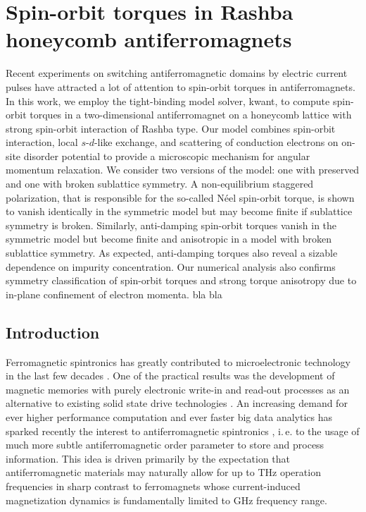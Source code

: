 \chapter{Spin-orbit torques in Rashba honeycomb antiferromagnets} %
Recent experiments on switching antiferromagnetic domains by electric current pulses have attracted a lot of attention to spin-orbit torques in antiferromagnets. In this work, we employ the tight-binding model solver, kwant,  to compute spin-orbit torques in a two-dimensional antiferromagnet on a honeycomb lattice with strong spin-orbit interaction of Rashba type. Our model combines spin-orbit interaction, local $s$-$d$-like exchange, and scattering of conduction electrons on on-site disorder potential to provide a microscopic mechanism for angular momentum relaxation. We consider two versions of the model: one with preserved and one with broken sublattice symmetry. A non-equilibrium staggered polarization, that is responsible for the so-called N\'eel spin-orbit torque, is shown to vanish identically in the symmetric model but may become finite if sublattice symmetry is broken. Similarly, anti-damping spin-orbit torques vanish in the symmetric model but become finite and anisotropic in a model with broken sublattice symmetry. As expected, anti-damping torques also reveal a sizable dependence on impurity concentration. Our numerical analysis also confirms symmetry classification of spin-orbit torques and strong torque anisotropy due to in-plane confinement of electron momenta. 
\vfill
bla bla
\clearpage

\section{Introduction}

Ferromagnetic spintronics has greatly contributed to microelectronic technology in the last few decades \cite{bader_spintronics_2010, sinova_new_2012, bhatti_spintronics_2017}. One of the practical results was the development of magnetic memories with purely electronic write-in and read-out processes as an alternative to existing solid state drive technologies \cite{kent_new_2015, sato_two-terminal_2018}. An increasing demand for ever higher performance computation and ever faster big data analytics has sparked recently the interest to antiferromagnetic spintronics \cite{macdonald_antiferromagnetic_2011, gomonay_spintronics_2014, wadley_electrical_2016, jungwirth_antiferromagnetic_2016, baltz_antiferromagnetic_2018, jungwirth_multiple_2018, jungfleisch_perspectives_2018}, i.\,e. to the usage of much more subtle antiferromagnetic order parameter to store and process information. This idea is driven primarily by the expectation that antiferromagnetic materials may naturally allow for up to THz operation frequencies \cite{gomonay_high_2016, olejnik_terahertz_2018, jungwirth_multiple_2018} in sharp contrast to ferromagnets whose current-induced magnetization dynamics is fundamentally limited to GHz frequency range. 
  
